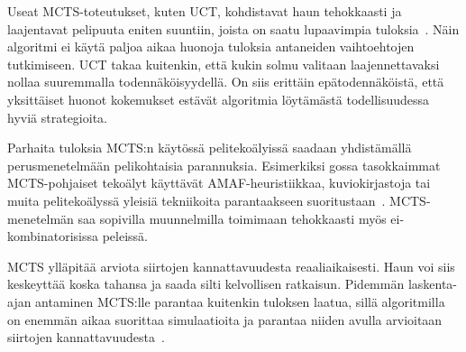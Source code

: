\documentclass[12pt,finnish]{tktltiki2}
\theoremstyle{definition}
\theoremstyle{remark}
\begin{document}
Useat MCTS-toteutukset, kuten UCT, kohdistavat haun tehokkaasti ja laajentavat pelipuuta eniten suuntiin, joista on saatu lupaavimpia tuloksia~\cite{browne}. Näin algoritmi ei käytä paljoa aikaa huonoja tuloksia antaneiden vaihtoehtojen tutkimiseen. UCT takaa kuitenkin, että kukin solmu valitaan laajennettavaksi nollaa suuremmalla todennäköisyydellä. On siis erittäin epätodennäköistä, että yksittäiset huonot kokemukset estävät algoritmia löytämästä todellisuudessa hyviä strategioita.

Parhaita tuloksia MCTS:n käytössä pelitekoälyissä saadaan yhdistämällä perusmenetelmään pelikohtaisia parannuksia. Esimerkiksi gossa tasokkaimmat MCTS-pohjaiset tekoälyt käyttävät AMAF-heuristiikkaa, kuviokirjastoja tai muita pelitekoälyssä yleisiä tekniikoita parantaakseen suoritustaan~\cite{browne}. MCTS-menetelmän saa sopivilla muunnelmilla toimimaan tehokkaasti myös ei-kombinatorisissa peleissä.

MCTS ylläpitää arviota siirtojen kannattavuudesta reaaliaikaisesti. Haun voi siis keskeyttää koska tahansa ja saada silti kelvollisen ratkaisun. Pidemmän laskenta-ajan antaminen MCTS:lle parantaa kuitenkin tuloksen laatua, sillä algoritmilla on enemmän aikaa suorittaa simulaatioita ja parantaa niiden avulla arvioitaan siirtojen kannattavuudesta~\cite{browne}.


%
%
% 
%







% 
\end{document}
